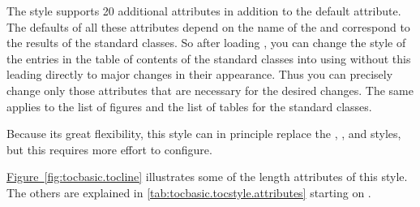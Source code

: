 \begin{description}
  The style supports 20 additional attributes in
  addition to the default  attribute. The defaults of all these
  attributes depend on the name of the  and correspond to
  the results of the standard classes. So after loading ,
  you can change the style of the entries in the table of contents of the
  standard classes into  using
   without this leading directly
  to major changes in their appearance. Thus you can precisely change only
  those attributes that are necessary for the desired changes. The same
  applies to the list of figures and the list of tables for the standard
  classes.

  Because its great flexibility, this style can in principle replace the
  , , and 
  styles, but this requires more effort to configure.

  \hyperref[fig:tocbasic.tocline]%
  {Figure~\ref*{fig:tocbasic.tocline}} illustrates some of the length
  attributes of this style. The others are explained in
  \autoref{tab:tocbasic.tocstyle.attributes} starting on
  .
  \begin{figure}
    \centering
\end{figure}
\end{description}
